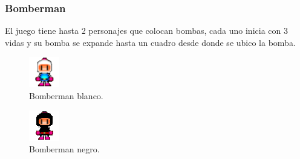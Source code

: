 \documentclass{beamer}
\begin{document}
\begin{frame}
\frametitle{Bomberman}
El juego tiene hasta 2 personajes que colocan bombas, cada uno inicia con 3 vidas y su bomba se expande hasta un cuadro desde donde se ubico la bomba.
\begin{figure}[H]
	\centering
	\includegraphics[scale=0.3]{assets/bomberman1/bomberman1frente.png}
    \caption{Bomberman blanco.}
    \label{fig:bombermanBranco}
\end{figure}  
\begin{figure}[H]
	\centering
	\includegraphics[scale=0.3]{assets/bomberman2/bomberman2frente.png}
    \caption{Bomberman negro.}
    \label{fig:bombermanNegro}
\end{figure} 

\end{frame}




\end{document}
